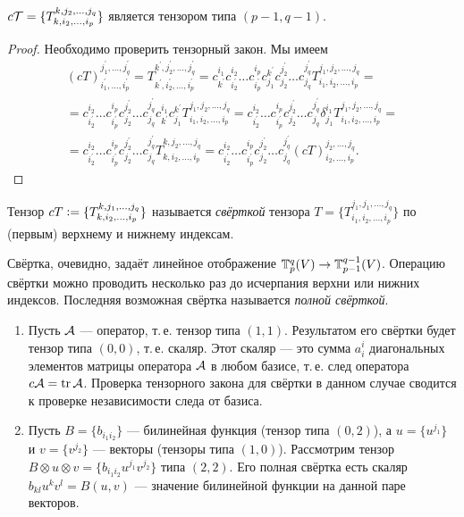 \begin{proposal}
    $c\mathcal{T} = \{T_{k, i_2, \ldots, i_p}^{k, j_2, \ldots, j_q}\}$ является тензором типа $(p - 1, q - 1)$.
\end{proposal}

\begin{proof}
    Необходимо проверить тензорный закон. Мы имеем
    \begin{multline*}
        (cT)_{i_1^\prime, \ldots, i_p^\prime}^{j_1^\prime, \ldots, j_q^\prime} = T_{k^\prime, i_2^\prime, \ldots, i_p^\prime}^{k^\prime, j_2^\prime, \ldots, j_q^\prime} = c^{i_1}_{k^\prime}c^{i_2}_{i_2^\prime}\ldots c^{i_p}_{i^\prime_p}c^{k^\prime}_{j_1}c^{j_2^\prime}_{j_2}\ldots c^{j^\prime_q}_{j_q}T_{i_1, i_2, \ldots, i_p}^{j_1, j_2, \ldots, j_q} =\\ = c^{i_2}_{i_2^\prime}\ldots c^{i_p}_{i^\prime_p}c^{j_2^\prime}_{j_2}\ldots c^{j^\prime_q}_{j_q}c^{i_1}_{k^\prime}c^{k^\prime}_{j_1}T_{i_1, i_2, \ldots, i_p}^{j_1, j_2, \ldots, j_q} = c^{i_2}_{i_2^\prime}\ldots c^{i_p}_{i^\prime_p}c^{j_2^\prime}_{j_2}\ldots c^{j^\prime_q}_{j_q}\delta^{i_1}_{j_1}T_{i_1, i_2, \ldots, i_p}^{j_1, j_2, \ldots, j_q} =\\ = c^{i_2}_{i_2^\prime}\ldots c^{i_p}_{i^\prime_p}c^{j_2^\prime}_{j_2}\ldots c^{j^\prime_q}_{j_q}T_{k, i_2, \ldots, i_p}^{k, j_2, \ldots, j_q} = c^{i_2}_{i_2^\prime}\ldots c^{i_p}_{i^\prime_p}c^{j_2^\prime}_{j_2}\ldots c^{j^\prime_q}_{j_q}(cT)_{i_2, \ldots, i_p}^{j_2, \ldots, j_q}.
    \end{multline*}
\end{proof}

\begin{definition}
    Тензор $cT \vcentcolon = \{T_{k, i_2, \ldots, i_p}^{k, j_1, \ldots, j_q}\}$ называется \textit{свёрткой} тензора $T = \{T_{i_1, i_2, \ldots, i_p}^{j_1, j_1, \ldots, j_q}\}$ по (первым) верхнему и нижнему индексам.
\end{definition}

Свёртка, очевидно, задаёт линейное отображение $\mathbb{T}_p^q(V) \to \mathbb{T}_{p - 1}^{q - 1}(V)$. Операцию свёртки можно проводить несколько раз до исчерпания верхни или нижних индексов. Последняя возможная свёртка называется \textit{полной свёрткой}.

\begin{example}
    \begin{enumerate}
        \item Пусть $\mathcal{A}$ --- оператор, т.\,е. тензор типа $(1, 1)$. Результатом его свёртки будет тензор типа $(0, 0)$, т.\,е. скаляр. Этот скаляр --- это сумма $a^i_i$ диагональных элементов матрицы оператора $\mathcal{A}$ в любом базисе, т.\,е. след оператора $c\mathcal{A} = \operatorname{tr}\mathcal{A}$. Проверка тензорного закона для свёртки в данном случае сводится к проверке независимости следа от базиса.
        \item Пусть $B = \{b_{i_1i_2}\}$ --- билинейная функция (тензор типа $(0, 2)$), а $u = \{u^{j_1}\}$ и $v = \{v^{j_2}\}$ --- векторы (тензоры типа $(1, 0)$). Рассмотрим тензор $B \otimes u \otimes v = \{b_{i_1i_2}u^{j_1}v^{j_2}\}$ типа $(2, 2)$. Его полная свёртка есть скаляр $b_{kl}u^kv^l = B(u, v)$ --- значение билинейной функции на данной паре векторов.
    \end{enumerate}
\end{example}

